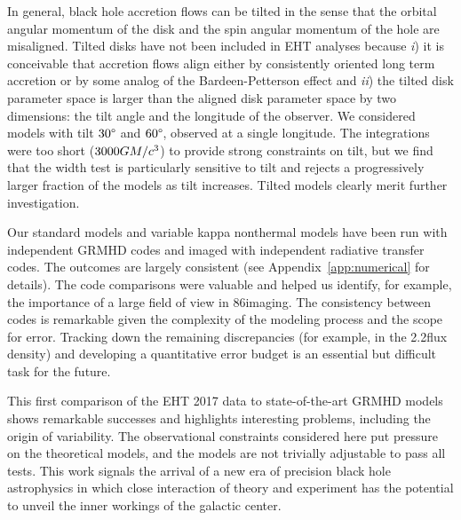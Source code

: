 In general, black hole accretion flows can be tilted in the sense that the orbital angular momentum of the disk and the spin angular momentum of the hole are misaligned.  Tilted disks have not been included in EHT analyses because \emph{i}) it is conceivable that accretion flows align either by consistently oriented long term accretion or by some analog of the Bardeen-Petterson effect \citep{1975ApJ...195L..65B} and \emph{ii}) the tilted disk parameter space is larger than the aligned disk parameter space by two dimensions: the tilt angle and the longitude of the observer.  We considered models with tilt $30\degree$ and $60\degree$, observed at a single longitude.  The integrations were too short ($3000GM/c^3$) to provide strong constraints on tilt, but we find that the \mring width test is particularly sensitive to tilt and rejects a progressively larger fraction of the models as tilt increases.  Tilted models clearly merit further investigation.

Our standard models and variable kappa nonthermal models have been run with independent GRMHD codes and imaged with independent radiative transfer codes.  The outcomes are largely consistent (see Appendix~\ref{app:numerical} for details).  The code comparisons were valuable and helped us identify, for example, the importance of a large field of view in 86\GHz imaging.  The consistency between codes is remarkable given the complexity of the modeling process and the scope for error.  Tracking down the remaining discrepancies (for example, in the 2.2\um flux density) and developing a quantitative error budget is an essential but difficult task for the future.

This first comparison of the EHT 2017 \sgra data to state-of-the-art GRMHD models shows remarkable successes and highlights interesting problems, including the origin of variability.  The observational constraints considered here put pressure on the theoretical models, and the models are not trivially adjustable to pass all tests.  This work signals the arrival of a new era of precision black hole astrophysics in which close interaction of theory and experiment has the potential to unveil the inner workings of the galactic center.
